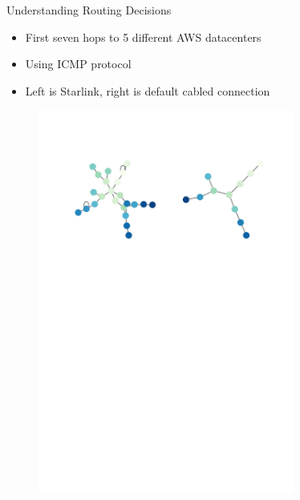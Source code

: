 \documentclass[NET,english,beameralt]{tumbeamer}
\begin{document}
\begin{frame}{Understanding Routing Decisions}
    \begin{itemize}
        \item First seven hops to 5 different AWS datacenters
        \item Using ICMP protocol
        \item Left is Starlink, right is default cabled connection
    \end{itemize}
    \begin{figure}
        \includegraphics[width=0.75\textwidth]{pics/aws-7-icmp.pdf}
    \end{figure}
\end{frame}
\end{document}
